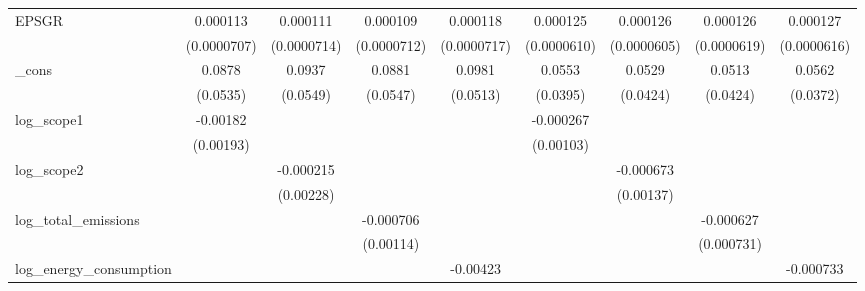 \begin{table}[htbp]
\begin{tabular}{l*{8}{c}}
EPSGR               &    0.000113         &    0.000111         &    0.000109         &    0.000118         &    0.000125\sym{*}  &    0.000126\sym{*}  &    0.000126\sym{*}  &    0.000127\sym{*}  \\
                    & (0.0000707)         & (0.0000714)         & (0.0000712)         & (0.0000717)         & (0.0000610)         & (0.0000605)         & (0.0000619)         & (0.0000616)         \\
\_cons              &      0.0878         &      0.0937         &      0.0881         &      0.0981\sym{*}  &      0.0553         &      0.0529         &      0.0513         &      0.0562         \\
                    &    (0.0535)         &    (0.0549)         &    (0.0547)         &    (0.0513)         &    (0.0395)         &    (0.0424)         &    (0.0424)         &    (0.0372)         \\
log\_scope1          &    -0.00182         &                     &                     &                     &   -0.000267         &                     &                     &                     \\
                    &   (0.00193)         &                     &                     &                     &   (0.00103)         &                     &                     &                     \\
log\_scope2          &                     &   -0.000215         &                     &                     &                     &   -0.000673         &                     &                     \\
                    &                     &   (0.00228)         &                     &                     &                     &   (0.00137)         &                     &                     \\
log\_total\_emissions &                     &                     &   -0.000706         &                     &                     &                     &   -0.000627         &                     \\
                    &                     &                     &   (0.00114)         &                     &                     &                     &  (0.000731)         &                     \\
log\_energy\_consumption&                     &                     &                     &    -0.00423         &                     &                     &                     &   -0.000733         \\

\end{tabular}
\end{table}
